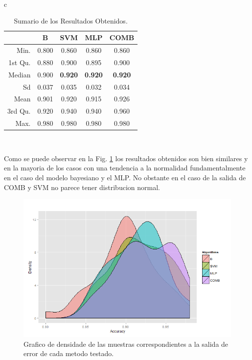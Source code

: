 \documentclass[12pt]{article}
\begin{document}
 
\begin{table}[!h]
\renewcommand{\arraystretch}{1.3}
\caption{Sumario de los Resultados Obtenidos. }
\label{tab:analisis_data}
\centering
\begin{tabular}{c}
\begin{tabular}{rcccc}
\hline
         &B   &     SVM  &  MLP   &  COMB     \\
\hline     
 Min.    &0.800   &0.860   &0.860   &0.860\\  
 1st Qu. &0.880   &0.900   &0.895   &0.900\\  
 Median  &0.900   &\textbf{0.920}   &\textbf{0.920}   &\textbf{0.920}\\  
 Sd      &0.037   &0.035   &0.032   &0.034\\
 Mean    &0.901   &0.920   &0.915   &0.926\\  
 3rd Qu. &0.920   &0.940   &0.940   &0.960\\  
 Max.    &0.980   &0.980   &0.980   &0.980\\  
\hline 
\end{tabular}\\
\end{tabular}
\end{table} 
 
Como se puede observar en la Fig. \ref{fig:densidade_acc} los resultados obtenidos son bien similares y en la mayoria de los casos con una tendencia a la normalidad fundamentalmente en el caso del modelo bayesiano y el MLP. No obstante en el caso de la salida de COMB y SVM no parece tener distribucion normal. 

\begin{figure}[h]
\centering
\includegraphics[width=4.5in]{../out/density-graph.png}
\caption{Grafico de densidade de las muestras correspondientes a la salida de error de cada metodo testado.}
\label{fig:densidade_acc}
\end{figure} 
\end{document}
